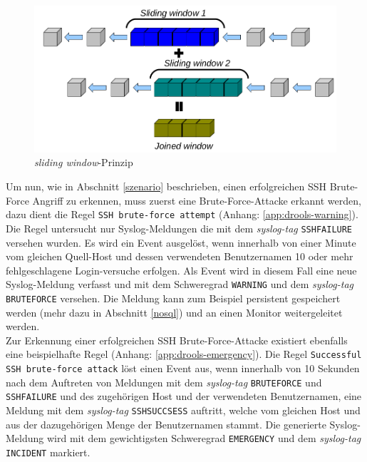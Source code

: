 \begin{figure}[htbp]
    \caption{\textit{sliding window}-Prinzip}
    \label{pic:drools}\vspace{0.2cm}
    \centering
    \includegraphics[scale=0.36]{img/drools-slide-00}
    
\end{figure}

Um nun, wie in Abschnitt \ref{szenario} beschrieben, einen erfolgreichen SSH Brute-Force 
Angriff zu erkennen, muss zuerst eine Brute-Force-Attacke erkannt werden, dazu dient die 
Regel \texttt{SSH brute-force attempt} (Anhang: \ref{app:drools-warning}). Die Regel 
untersucht nur Syslog-Meldungen die mit dem \textit{syslog-tag} \texttt{SSHFAILURE} 
versehen wurden. Es wird ein Event ausgelöst, wenn innerhalb von einer Minute vom 
gleichen Quell-Host und dessen verwendeten Benutzernamen 10 oder mehr fehlgeschlagene 
Login-versuche erfolgen. Als Event wird in diesem Fall eine neue Syslog-Meldung verfasst 
und mit dem Schweregrad \texttt{WARNING} und dem \textit{syslog-tag} \texttt{BRUTEFORCE} 
versehen. Die Meldung kann zum Beispiel persistent gespeichert werden (mehr dazu in 
Abschnitt \ref{nosql}) und an einen Monitor weitergeleitet werden.\\

Zur Erkennung einer erfolgreichen SSH Brute-Force-Attacke existiert ebenfalls eine 
beispielhafte Regel (Anhang: \ref{app:drools-emergency}). Die Regel \texttt{Successful 
SSH brute-force attack} löst einen Event aus, wenn innerhalb von 10 Sekunden nach dem 
Auftreten von Meldungen mit dem \textit{syslog-tag} \texttt{BRUTEFORCE} und 
\texttt{SSHFAILURE} und des zugehörigen Host und der verwendeten Benutzernamen, eine 
Meldung mit dem \textit{syslog-tag} \texttt{SSHSUCCSESS} auftritt, welche vom 
gleichen Host und aus der dazugehörigen Menge der Benutzernamen stammt.
Die generierte Syslog-Meldung wird mit dem gewichtigsten Schweregrad \texttt{EMERGENCY} 
und dem \textit{syslog-tag} \texttt{INCIDENT} markiert.\\

